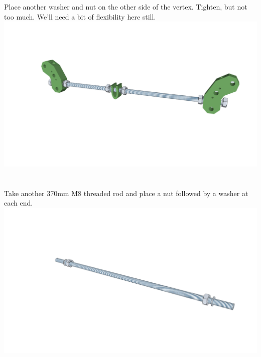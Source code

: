 	\section{}
	Place another washer and nut on the other side of the vertex. Tighten, but not too much. We'll need a
	bit of flexibility here still. \\
	\includegraphics[width=1\linewidth]{graphics/ch1_8.png}
	
	\section{}
	Take another 370mm M8 threaded rod and place a nut followed by a washer at each
	end. \\
	\includegraphics[width=1\linewidth]{graphics/ch1_9.png}
	
